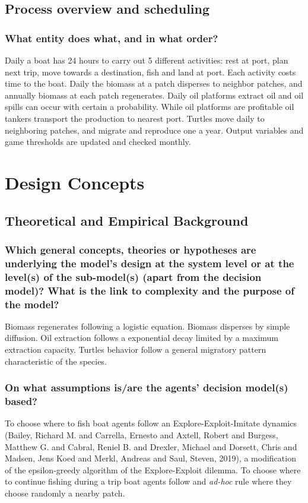 \documentclass[11pt]{article}
\begin{document}
\subsection{Process overview and scheduling}
\label{sec:org112e0b9}
\subsubsection{What entity does what, and in what order?}
\label{sec:orgc6f1c72}
Daily a boat has 24 hours to carry out 5 different activities: rest at port, plan next trip, move towards a destination, fish and land at port. Each activity costs time to the boat.
Daily the biomass at a patch disperses to neighbor patches, and annually biomass at each patch regenerates.
Daily oil platforms extract oil and oil spills can occur with certain a probability. While oil platforms are profitable oil tankers transport the production to nearest port.
Turtles move daily to neighboring patches, and migrate and reproduce one a year.
Output variables and game thresholds are updated and checked monthly.
\section{Design Concepts}
\label{sec:orgb0d1bd0}
\subsection{Theoretical and Empirical Background}
\label{sec:orgc09369c}
\subsubsection{Which general concepts, theories or hypotheses are underlying the model's design at the system level or at the level(s) of the sub-model(s) (apart from the decision model)? What is the link to complexity and the purpose of the model?}
\label{sec:org349589a}
Biomass regenerates following a logistic equation. Biomass disperses by simple diffusion. Oil extraction follows a exponential decay limited by a maximum extraction capacity. Turtles behavior follow a general migratory pattern characteristic of the species.
\subsubsection{On what assumptions is/are the agents' decision model(s) based?}
\label{sec:orgaaf2dea}
To choose where to fish boat agents follow an Explore-Exploit-Imitate dynamics (Bailey, Richard M. and Carrella, Ernesto and Axtell, Robert and Burgess, Matthew G. and Cabral, Reniel B. and Drexler, Michael and Dorsett, Chris and Madsen, Jens Koed and Merkl, Andreas and Saul, Steven, 2019), a modification of the epsilon-greedy algorithm of the Explore-Exploit dilemma. To choose where to continue fishing during a trip boat agents follow and \emph{ad-hoc} rule where they choose randomly a nearby patch. 
\end{document}
